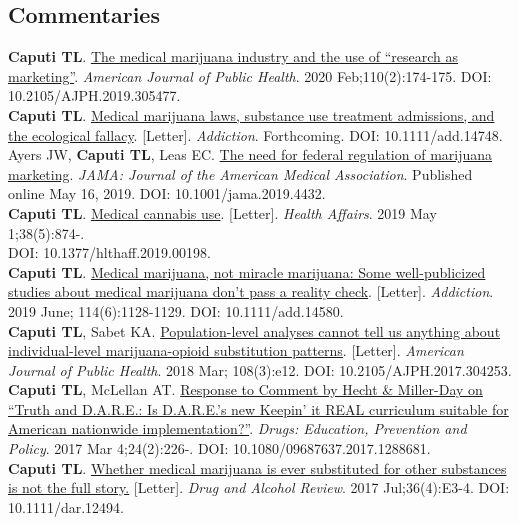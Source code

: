 \documentclass[11pt, letterpaper]{article}
\newcommand{\years}[1]{\marginnote{\normalsize #1}}
\begin{document}
\subsection*{Commentaries}
\years{2020}\textbf{Caputi TL}. \href{http://dx.doi.org/10.2105/AJPH.2019.305477}{The medical marijuana industry and the use of ``research as marketing''}. \emph{American Journal of Public Health}. 2020 Feb;110(2):174-175. DOI: 10.2105/AJPH.2019.305477.\\[.2cm]
\years{2020}\textbf{Caputi TL}. \href{http://dx.doi.org/10.1111/add.14748}{Medical marijuana laws, substance use treatment admissions, and the ecological fallacy}. [Letter]. \textit{Addiction}. Forthcoming. DOI: 10.1111/add.14748.\\[.2cm]
\years{2019}Ayers JW, \textbf{Caputi TL}, Leas EC. \href{http://dx.doi.org/10.1001/jama.2019.4432}{The need for federal regulation of marijuana marketing}. \textit{JAMA: Journal of the American Medical Association}. Published online May 16, 2019. DOI: 10.1001/jama.2019.4432.\\[.2cm]
\years{2019}\textbf{Caputi TL}. \href{http://dx.doi.org/10.1377/hlthaff.2019.00198}{Medical cannabis use}. [Letter]. \emph{Health Affairs}. 2019 May 1;38(5):874-.\\DOI: 10.1377/hlthaff.2019.00198.\\[.2cm]
\years{2019}\textbf{Caputi TL}. \href{http://dx.doi.org/10.1111/add.14580}{Medical marijuana, not miracle marijuana: Some well-publicized studies about medical marijuana don't pass a reality check}. [Letter]. \emph{Addiction}. 2019 June; 114(6):1128-1129. DOI: 10.1111/add.14580.\\[.2cm]
\years{2018}\textbf{Caputi TL}, Sabet KA. \href{http://dx.doi.org/10.2105/AJPH.2017.304253}{Population-level analyses cannot tell us anything about individual-level marijuana-opioid substitution patterns}.  [Letter]. \emph{American Journal of Public Health}. 2018 Mar; 108(3):e12. DOI: 10.2105/AJPH.2017.304253.\\[.2cm]
\years{2017}\textbf{Caputi TL}, McLellan AT.  \href{http://dx.doi.org/10.1080/09687637.2017.1288681}{Response to Comment by Hecht \& Miller-Day on “Truth and D.A.R.E.: Is D.A.R.E.’s new Keepin’ it REAL curriculum suitable for American nationwide implementation?”}. \textit{Drugs: Education, Prevention and Policy}. 2017 Mar 4;24(2):226-. DOI: 10.1080/09687637.2017.1288681.\\[.2cm]
\years{2016}\textbf{Caputi TL}.  \href{http://dx.doi.org/10.1111/dar.12494}{Whether medical marijuana is ever substituted for other substances is not the full story.} [Letter]. \textit{Drug and Alcohol Review}. 2017 Jul;36(4):E3-4. DOI: 10.1111/dar.12494.\\[.2cm]
\end{document}
